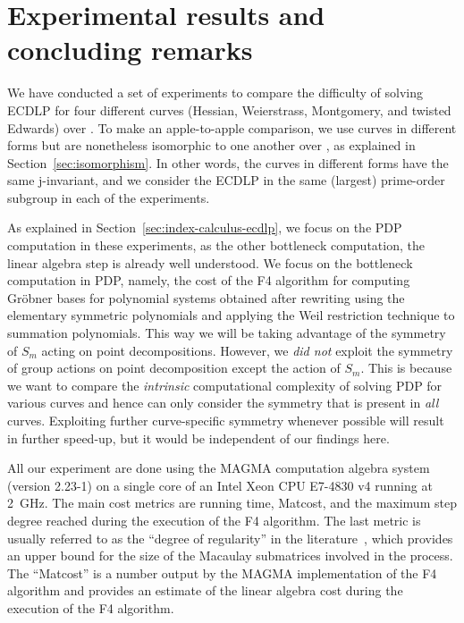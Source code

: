 \section{Experimental results and concluding remarks}
\label{sec:experiment}

We have conducted a set of experiments to compare the difficulty of
solving ECDLP for four different curves (Hessian, Weierstrass,
Montgomery, and twisted Edwards) over .
%
To make an apple-to-apple comparison, we use curves in different forms
but are nonetheless isomorphic to one another over , as
explained in Section~\ref{sec:isomorphism}.
%
In other words, the curves in different forms have the same
j-invariant, and we consider the ECDLP in the same (largest)
prime-order subgroup in each of the experiments.

As explained in Section~\ref{sec:index-calculus-ecdlp}, we focus on
the PDP computation in these experiments, as the other bottleneck
computation, the linear algebra step is already well understood.
%
We focus on the bottleneck computation in PDP, namely, the cost of the
F4 algorithm for computing Gr\"obner bases for polynomial systems
obtained after rewriting using the elementary symmetric polynomials
and applying the Weil restriction technique to summation polynomials.
%
This way we will be taking advantage of the symmetry of $S_m$ acting
on point decompositions.
% 
However, we \emph{did not} exploit the symmetry of group actions on
point decomposition except the action of $S_m$.
%
This is because we want to compare the \emph{intrinsic} computational
complexity of solving PDP for various curves and hence can only
consider the symmetry that is present in \emph{all} curves.
%
Exploiting further curve-specific symmetry whenever possible will
result in further speed-up, but it would be independent of our
findings here.

All our experiment are done using the MAGMA computation algebra system
(version 2.23-1) on a single core of an Intel Xeon CPU E7-4830 v4
running at 2~GHz.
%
The main cost metrics are running time, Matcost, and the maximum step
degree reached during the execution of the F4 algorithm.
%
The last metric is usually referred to as the ``degree of regularity''
in the literature~\cite{DBLP:conf/indocrypt/GalbraithG14}, which
provides an upper bound for the size of the Macaulay submatrices
involved in the process.
%
The ``Matcost'' is a number output by the MAGMA implementation of the
F4 algorithm and provides an estimate of the linear algebra cost
during the execution of the F4 algorithm.

